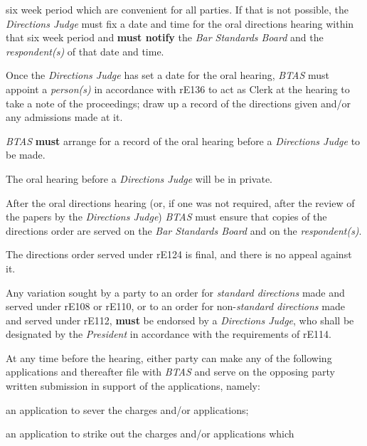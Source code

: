 six week period which are convenient for all parties. If that is not
possible, the \emph{Directions Judge }must fix a date and time for the
oral directions hearing within that six week period and  \textcolor{myred}{\textbf{must notify}}
the \emph{Bar Standards Board} and the \emph{respondent(s)} of that date
and time.\\
\par
Once the \emph{Directions Judge }has set a date for the oral
hearing, \emph{BTAS }must appoint a \emph{person(s)} in accordance with
rE136 to act as Clerk at the hearing to take a note of the proceedings;
draw up a record of the directions given and/or any admissions made at
it.\\
\par
\emph{BTAS}  \textcolor{myred}{\textbf{must}} arrange for a record of the oral hearing before
a \emph{Directions Judge }to be made.\\
\par
The oral hearing before a \emph{Directions Judge} will be in private.\\
\par
After the oral directions hearing (or, if one was not required, after
the review of the papers by the \emph{Directions
Judge}) \emph{BTAS }must ensure that copies of the directions order are
served on the \emph{Bar Standards Board} and on
the \emph{respondent(s)}.\\
\par
The directions order served under rE124 is final, and there is no appeal
against it.\\
\par
Any variation sought by a party to an order for \emph{standard
directions} made and served under rE108 or rE110, or to an order for
non-\emph{standard directions} made and served under rE112,  \textcolor{myred}{\textbf{must}} be
endorsed by a \emph{Directions Judge}, who shall be designated by
the \emph{President} in accordance with the requirements of rE114.\\
\par
{}
At any time before the hearing, either party can make any of the
following applications and thereafter file with \emph{BTAS} and serve on
the opposing party written submission in support of the applications,
namely:\\\nl \item an application to sever the charges and/or applications;\item an application to strike out the charges and/or applications which
